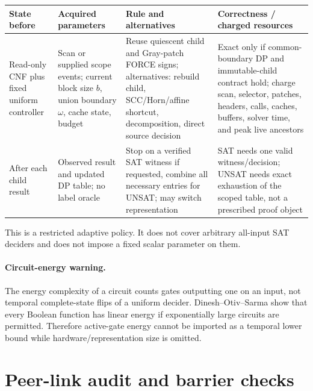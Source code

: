 \documentclass[11pt]{article}
\begin{document}
\begin{center}
\begin{tabular}{p{.17\linewidth}p{.22\linewidth}p{.27\linewidth}p{.25\linewidth}}
\toprule
State before & Acquired parameters & Rule and alternatives & Correctness / charged resources\\
\midrule
Read-only CNF plus fixed uniform controller & Scan or supplied scope events; current block size $b$, union boundary $\omega$, cache state, budget & Reuse quiescent child and Gray-patch FORCE signs; alternatives: rebuild child, SCC/Horn/affine shortcut, decomposition, direct source decision & Exact only if common-boundary DP and immutable-child contract hold; charge scan, selector, patches, headers, calls, caches, buffers, solver time, and peak live ancestors\\
After each child result & Observed result and updated DP table; no label oracle & Stop on a verified SAT witness if requested, combine all necessary entries for UNSAT; may switch representation & SAT needs one valid witness/decision; UNSAT needs exact exhaustion of the scoped table, not a prescribed proof object\\
\bottomrule
\end{tabular}
\end{center}

This is a restricted adaptive policy.  It does not cover arbitrary all-input SAT deciders and does not impose a fixed scalar parameter on them.

\paragraph{Circuit-energy warning.}
The energy complexity of a circuit counts gates outputting one on an input, not temporal complete-state flips of a uniform decider.  Dinesh--Otiv--Sarma show that every Boolean function has linear energy if exponentially large circuits are permitted.  Therefore active-gate energy cannot be imported as a temporal lower bound while hardware/representation size is omitted.

\section{Peer-link audit and barrier checks}
\end{document}
